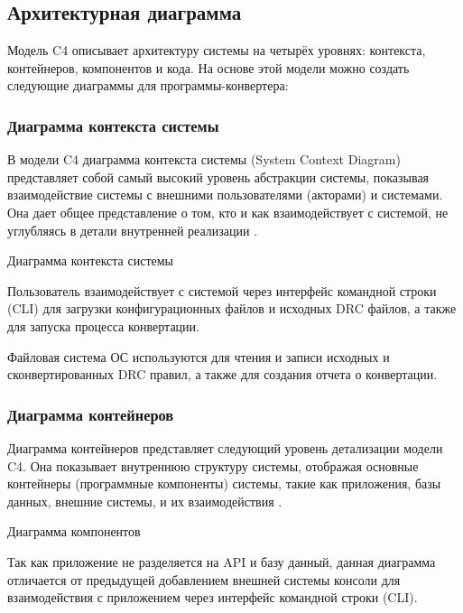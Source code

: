 \subsection{Архитектурная диаграмма}

Модель C4 описывает архитектуру системы на четырёх уровнях:
контекста, контейнеров, компонентов и кода.
На основе этой модели можно создать следующие диаграммы
для программы-конвертера:

\subsubsection{Диаграмма контекста системы}

В модели C4 диаграмма контекста системы (System Context Diagram)
представляет собой самый высокий уровень абстракции системы,
показывая взаимодействие системы с внешними пользователями (акторами)
и системами. Она дает общее представление о том,
кто и как взаимодействует с системой,
не углубляясь в детали внутренней реализации
.
   
\begin{image}
	\caption{Диаграмма контекста системы}
	\label{fig:c4:system:context}
\end{image}

Пользователь взаимодействует с системой через интерфейс командной строки (CLI)
для загрузки конфигурационных файлов и исходных DRC файлов,
а также для запуска процесса конвертации.\par
Файловая система ОС используются для чтения и записи исходных
и сконвертированных DRC правил, а также для создания отчета о конвертации.

\subsubsection{Диаграмма контейнеров}

Диаграмма контейнеров представляет следующий уровень детализации модели C4.
Она показывает внутреннюю структуру системы,
отображая основные контейнеры (программные компоненты) системы,
такие как приложения, базы данных, внешние системы, и их взаимодействия
.
   
\begin{image}
	\caption{Диаграмма компонентов}
	\label{fig:c4:container}
\end{image}

Так как приложение не разделяется на API и базу данный,
данная диаграмма отличается от предыдущей добавлением внешней системы
консоли для взаимодействия с приложением
через интерфейс командной строки (CLI).

